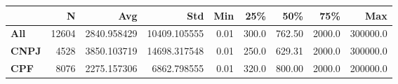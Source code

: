 \begin{tabular}{lrrrrrrrr}
\toprule
{} &     N &          Avg &           Std &   Min &    25\% &     50\% &     75\% &       Max \\
\midrule
\textbf{All } & 12604 &  2840.958429 &  10409.105555 &  0.01 &  300.0 &  762.50 &  2000.0 &  300000.0 \\
\textbf{CNPJ} &  4528 &  3850.103719 &  14698.317548 &  0.01 &  250.0 &  629.31 &  2000.0 &  300000.0 \\
\textbf{CPF } &  8076 &  2275.157306 &   6862.798555 &  0.01 &  320.0 &  800.00 &  2000.0 &  200000.0 \\
\bottomrule
\end{tabular}

